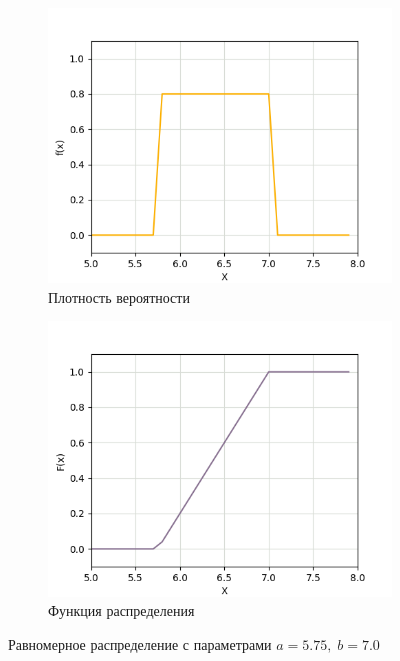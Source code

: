 \begin{figure}[H]
	\begin{subfigure}{.5\textwidth}
		\centering
		\includegraphics[width=.8\linewidth]{assets/unipdf575-7.png}
		\caption{Плотность вероятности}
		\label{fig:unipdf575-7}
	\end{subfigure}%
	\begin{subfigure}{.5\textwidth}
		\centering
		\includegraphics[width=.8\linewidth]{assets/unicdf575-7.png}
		\caption{Функция распределения}
		\label{fig:unicdf575-7}
	\end{subfigure}
	\caption{Равномерное распределение с параметрами $a = 5.75, \; b = 7.0$}
	\label{fig:uni575-7}
\end{figure}

